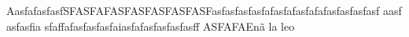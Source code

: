 AasfafasfasfSFASFAFASFASFASFASFASFasfasfasfasfafasfafasfafafasfasfasfasf aasf     asfasfia sfaffafasfasfasfaiasfafasfasfasfasff ASFAFAEnã la leo 
